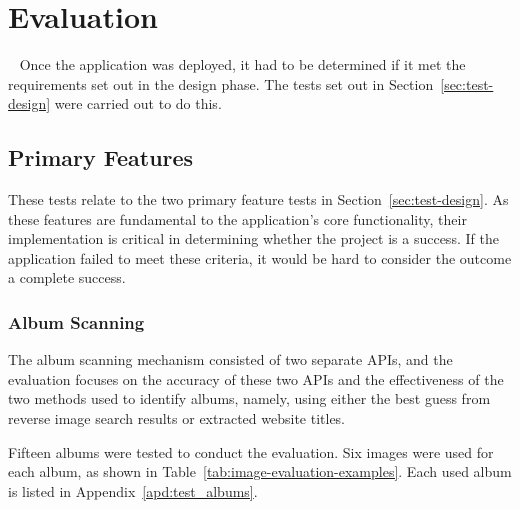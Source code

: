 \chapter{Evaluation}~\label{cha:evaluation}
Once the application was deployed, it had to be determined if it met the requirements set out in the design phase. The tests set out in Section~\ref{sec:test-design} were carried out to do this.

\section{Primary Features}
These tests relate to the two primary feature tests in Section~\ref{sec:test-design}. As these features are fundamental to the application's core functionality, their implementation is critical in determining whether the project is a success. If the application failed to meet these criteria, it would be hard to consider the outcome a complete success.

\subsection{Album Scanning}
The album scanning mechanism consisted of two separate APIs, and the evaluation focuses on the accuracy of these two APIs and the effectiveness of the two methods used to identify albums, namely, using either the best guess from reverse image search results or extracted website titles.

Fifteen albums were tested to conduct the evaluation. Six images were used for each album, as shown in Table~\ref{tab:image-evaluation-examples}.
\ifshowappendix
Each used album is listed in Appendix~\ref{apd:test_albums}.
\fi

